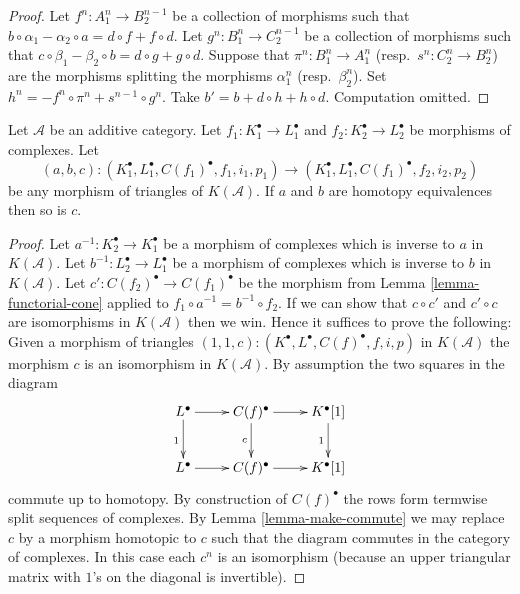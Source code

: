 \begin{proof}
Let $f^n : A_1^n \to B_2^{n - 1}$ be a collection of morphisms
such that $b \circ \alpha_1 - \alpha_2 \circ a =
d  \circ f + f \circ d$. Let
$g^n : B_1^n \to C_2^{n - 1}$ be a collection of morphisms
such that $c \circ \beta_1 - \beta_2 \circ b =
d  \circ g + g \circ d$. Suppose that
$\pi^n : B_1^n \to A_1^n$ (resp.\ $s^n : C_2^n \to B_2^n$)
are the morphisms splitting the morphisms $\alpha_1^n$
(resp.\ $\beta_2^n$). Set $h^n = - f^n \circ \pi^n + s^{n - 1} \circ g^n$.
Take $b' = b + d \circ h + h \circ d$. Computation omitted.
\end{proof}

\begin{lemma}
\label{lemma-third-isomorphism}
Let $\mathcal{A}$ be an additive category.
Let $f_1 : K_1^\bullet \to L_1^\bullet$ and
$f_2 : K_2^\bullet \to L_2^\bullet$ be morphisms of complexes.
Let
$$
(a, b, c) :
(K_1^\bullet, L_1^\bullet, C(f_1)^\bullet, f_1, i_1, p_1)
\longrightarrow
(K_1^\bullet, L_1^\bullet, C(f_1)^\bullet, f_2, i_2, p_2)
$$
be any morphism of triangles of $K(\mathcal{A})$.
If $a$ and $b$ are homotopy equivalences then so is $c$.
\end{lemma}

\begin{proof}
Let $a^{-1} : K_2^\bullet \to K_1^\bullet$ be a morphism of complexes which
is inverse to $a$ in $K(\mathcal{A})$.
Let $b^{-1} : L_2^\bullet \to L_1^\bullet$ be a morphism of complexes which
is inverse to $b$ in $K(\mathcal{A})$.
Let $c' : C(f_2)^\bullet \to C(f_1)^\bullet$
be the morphism from Lemma \ref{lemma-functorial-cone} applied
to $f_1 \circ a^{-1} = b^{-1} \circ f_2$. If we can show that
$c \circ c'$ and $c' \circ c$ are isomorphisms in $K(\mathcal{A})$
then we win. Hence it suffices to prove the following: Given
a morphism of triangles
$(1, 1, c) : (K^\bullet, L^\bullet, C(f)^\bullet, f, i, p)$
in $K(\mathcal{A})$ the morphism $c$ is an isomorphism in $K(\mathcal{A})$.
By assumption the two squares in the diagram
$$
\xymatrix{
L^\bullet \ar[r] \ar[d]_1 &
C(f)^\bullet \ar[r] \ar[d]_c &
K^\bullet[1] \ar[d]_1 \\
L^\bullet \ar[r] &
C(f)^\bullet \ar[r] &
K^\bullet[1]
}
$$
commute up to homotopy. By construction of $C(f)^\bullet$ the rows
form termwise split sequences of complexes.
By Lemma \ref{lemma-make-commute} we may replace $c$ by
a morphism homotopic to $c$ such that the diagram commutes in the
category of complexes. In this case each $c^n$ is an isomorphism
(because an upper triangular matrix with $1$'s on the diagonal is invertible).
\end{proof}

